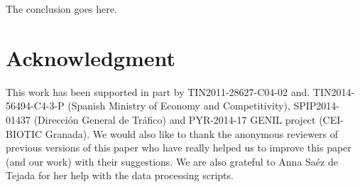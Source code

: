 \documentclass[journal,onecolumn]{IEEEtran}
\begin{document}
The conclusion goes here.


\section*{Acknowledgment}

This work has been supported in part by TIN2011-28627-C04-02 and. 
TIN2014-56494-C4-3-P (Spanish Ministry of Economy and Competitivity),
SPIP2014-01437 (Direcci{\'o}n General de Tr{\'a}fico) and PYR-2014-17
GENIL project (CEI-BIOTIC Granada). We would also like to thank the
anonymous reviewers of previous versions of this paper who have really helped us to improve
this paper (and our work) with their suggestions. We are also grateful
to Anna Saéz de Tejada for her help with the data processing scripts. 




\end{document}
